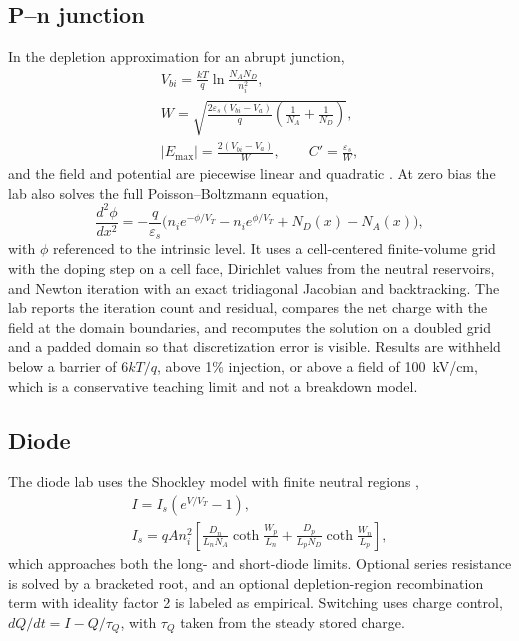 \documentclass[conference]{IEEEtran}
\begin{document}
\subsection{P--n junction}
In the depletion approximation for an abrupt junction,
\begin{gather}
V_{bi}=\frac{kT}{q}\ln\frac{N_AN_D}{n_i^2},\\
W=\sqrt{\frac{2\varepsilon_s(V_{bi}-V_a)}{q}\left(\frac{1}{N_A}+\frac{1}{N_D}\right)},\\
|E_{\max}|=\frac{2(V_{bi}-V_a)}{W},\qquad C'=\frac{\varepsilon_s}{W},
\end{gather}
and the field and potential are piecewise linear and quadratic \cite{neamen2012}. At zero bias the lab also solves the full Poisson--Boltzmann equation,
\begin{equation}
\frac{d^2\phi}{dx^2}=-\frac{q}{\varepsilon_s}\Big(n_ie^{-\phi/V_T}-n_ie^{\phi/V_T}+N_D(x)-N_A(x)\Big),
\end{equation}
with $\phi$ referenced to the intrinsic level. It uses a cell-centered finite-volume grid with the doping step on a cell face, Dirichlet values from the neutral reservoirs, and Newton iteration with an exact tridiagonal Jacobian and backtracking. The lab reports the iteration count and residual, compares the net charge with the field at the domain boundaries, and recomputes the solution on a doubled grid and a padded domain so that discretization error is visible. Results are withheld below a barrier of $6kT/q$, above 1\% injection, or above a field of 100~kV/cm, which is a conservative teaching limit and not a breakdown model.

\subsection{Diode}
The diode lab uses the Shockley model with finite neutral regions \cite{shockley1949},
\begin{gather}
I=I_s\!\left(e^{V/V_T}-1\right),\\
I_s=qAn_i^2\!\left[\frac{D_n}{L_nN_A}\coth\frac{W_p}{L_n}+\frac{D_p}{L_pN_D}\coth\frac{W_n}{L_p}\right],
\end{gather}
which approaches both the long- and short-diode limits. Optional series resistance is solved by a bracketed root, and an optional depletion-region recombination term with ideality factor 2 \cite{sah1957} is labeled as empirical. Switching uses charge control, $dQ/dt=I-Q/\tau_Q$, with $\tau_Q$ taken from the steady stored charge.
\end{document}
